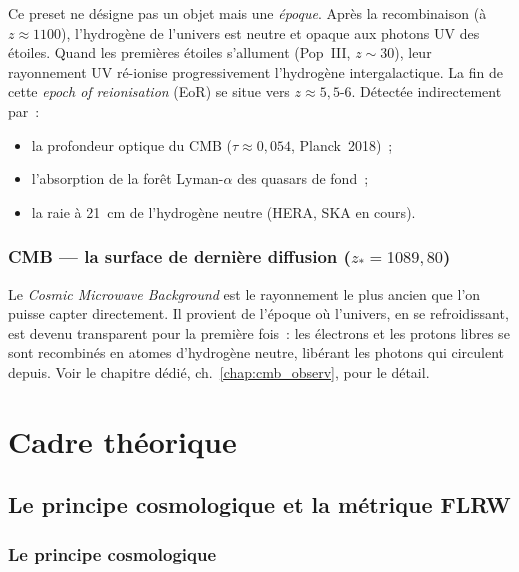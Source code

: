 \documentclass[11pt,a4paper,openany]{report}
\begin{document}
Ce preset ne désigne pas un objet mais une \emph{époque}. Après la
recombinaison (à $z \approx 1100$), l'hydrogène de l'univers est neutre et
opaque aux photons UV des étoiles. Quand les premières étoiles s'allument
(Pop~III, $z \sim 30$), leur rayonnement UV ré-ionise progressivement
l'hydrogène intergalactique. La fin de cette \emph{epoch of reionisation}
(EoR) se situe vers $z \approx 5{,}5\text{-}6$. Détectée indirectement par~:
\begin{itemize}[topsep=2pt]
\item la profondeur optique du CMB ($\tau \approx 0{,}054$, Planck~2018)~;
\item l'absorption de la forêt Lyman-$\alpha$ des quasars de fond~;
\item la raie à 21~cm de l'hydrogène neutre (HERA, SKA en cours).
\end{itemize}

\section{CMB --- la surface de dernière diffusion ($z_{*} = 1089{,}80$)}

Le \emph{Cosmic Microwave Background} est le rayonnement le plus
ancien que l'on puisse capter directement. Il provient de l'époque où
l'univers, en se refroidissant, est devenu transparent pour la première fois~:
les électrons et les protons libres se sont recombinés en atomes d'hydrogène
neutre, libérant les photons qui circulent depuis. Voir le chapitre dédié,
ch.~\ref{chap:cmb_observ}, pour le détail.

\clearpage

\part{Cadre théorique}

\chapter{Le principe cosmologique et la métrique FLRW}
\label{chap:flrw}

\section{Le principe cosmologique}
\end{document}

